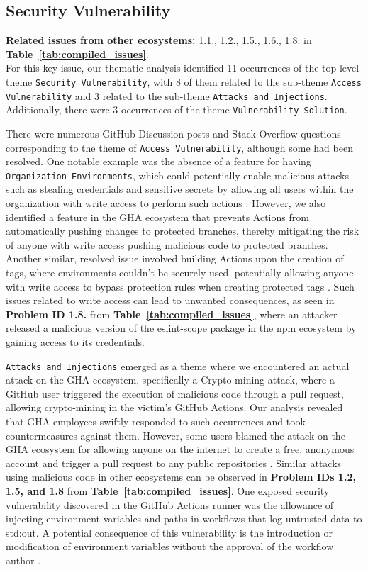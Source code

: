 \documentclass[conference]{IEEEtran}
\begin{document}
\subsection*{\textbf{Security Vulnerability}}
\textbf{Related issues from other ecosystems:} 1.1., 1.2., 1.5., 1.6., 1.8. in \textbf{Table~\ref{tab:compiled_issues}}.\\

	For this key issue, our thematic analysis identified 11 occurrences of the top-level theme \texttt{Security Vulnerability}, with 8 of them related to the sub-theme \texttt{Access Vulnerability} and 3 related to the sub-theme \texttt{Attacks and Injections}. Additionally, there were 3 occurrences of the theme \texttt{Vulnerability Solution}.

	There were numerous GitHub Discussion posts and Stack Overflow questions corresponding to the theme of \texttt{Access Vulnerability}, although some had been resolved. One notable example was the absence of a feature for having \texttt{Organization Environments}, which could potentially enable malicious attacks such as stealing credentials and sensitive secrets by allowing all users within the organization with write access to perform such actions \cite{philomory2024}. However, we also identified a feature in the GHA ecosystem that prevents Actions from automatically pushing changes to protected branches, thereby mitigating the risk of anyone with write access pushing malicious code to protected branches\cite{robozevel2024}. Another similar, resolved issue involved building Actions upon the creation of tags, where environments couldn't be securely used, potentially allowing anyone with write access to bypass protection rules when creating protected tags \cite{WolfspiritM2024}. Such issues related to write access can lead to unwanted consequences, as seen in \textbf{Problem ID 1.8.} from \textbf{Table~\ref{tab:compiled_issues}}, where an attacker released a malicious version of the eslint-scope package in the npm ecosystem by gaining access to its credentials.

	\texttt{Attacks and Injections} emerged as a theme where we encountered an actual attack on the GHA ecosystem, specifically a Crypto-mining attack, where a GitHub user triggered the execution of malicious code through a pull request, allowing crypto-mining in the victim's GitHub Actions. Our analysis revealed that GHA employees swiftly responded to such occurrences and took countermeasures against them. However, some users blamed the attack on the GHA ecosystem for allowing anyone on the internet to create a free, anonymous account and trigger a pull request to any public repositories \cite{thibaultduponchelle2024}. Similar attacks using malicious code in other ecosystems can be observed in \textbf{Problem IDs 1.2, 1.5, and 1.8} from \textbf{Table~\ref{tab:compiled_issues}}. One exposed security vulnerability discovered in the GitHub Actions runner was the allowance of injecting environment variables and paths in workflows that log untrusted data to std:out. A potential consequence of this vulnerability is the introduction or modification of environment variables without the approval of the workflow author \cite{DaanDeMeyer2024}.
\end{document}
